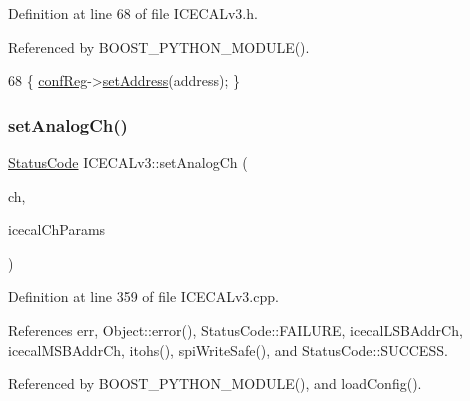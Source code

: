 Definition at line 68 of file I\+C\+E\+C\+A\+Lv3.\+h.



Referenced by B\+O\+O\+S\+T\+\_\+\+P\+Y\+T\+H\+O\+N\+\_\+\+M\+O\+D\+U\+L\+E().


\begin{DoxyCode}
68 \{   \hyperlink{classICECALv3_a6e8b6c03f5b0f1d8281bf8a0fa46064f}{confReg}->\hyperlink{classIOobject_ae0d372aaeafe3da3c239677118deb2ac}{setAddress}(address);   \}
\end{DoxyCode}
\mbox{\label{classICECALv3_a9578e4d13c250d8bc417f68c79d6a21d}} 
\subsubsection{\texorpdfstring{set\+Analog\+Ch()}{setAnalogCh()}}
{\footnotesize\ttfamily \hyperlink{classStatusCode}{Status\+Code} I\+C\+E\+C\+A\+Lv3\+::set\+Analog\+Ch (\begin{DoxyParamCaption}\item[{int}]{ch,  }\item[{Py\+Object $\ast$}]{icecal\+Ch\+Params }\end{DoxyParamCaption})}



Definition at line 359 of file I\+C\+E\+C\+A\+Lv3.\+cpp.



References err, Object\+::error(), Status\+Code\+::\+F\+A\+I\+L\+U\+RE, icecal\+L\+S\+B\+Addr\+Ch, icecal\+M\+S\+B\+Addr\+Ch, itohs(), spi\+Write\+Safe(), and Status\+Code\+::\+S\+U\+C\+C\+E\+SS.



Referenced by B\+O\+O\+S\+T\+\_\+\+P\+Y\+T\+H\+O\+N\+\_\+\+M\+O\+D\+U\+L\+E(), and load\+Config().


